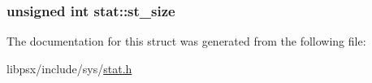 \subsubsection[{st\+\_\+size}]{\setlength{\rightskip}{0pt plus 5cm}unsigned int stat\+::st\+\_\+size}\label{structstat_af4a3c7f1e38a875f5e01700937482132}


The documentation for this struct was generated from the following file\+:\begin{DoxyCompactItemize}
\item 
libpsx/include/sys/\hyperlink{stat_8h}{stat.\+h}\end{DoxyCompactItemize}
